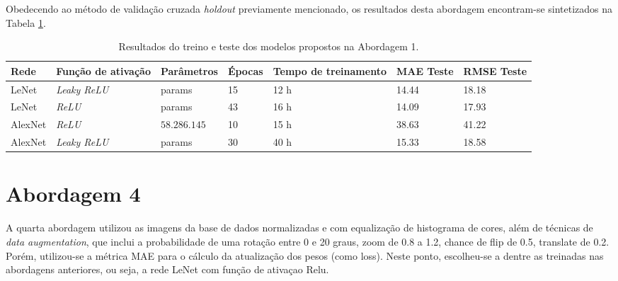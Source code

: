 
	Obedecendo ao método de validação cruzada \emph{holdout} previamente mencionado, os resultados desta abordagem encontram-se sintetizados na Tabela \ref{tab:results-2}.

	\begin{table}[!ht]
		\caption{Resultados do treino e teste dos modelos propostos na Abordagem 1.}
		\label{tab:results-2}
		\begin{adjustbox}{width=1\textwidth}
			\begin{tabular}{l l l l l l l}
				\toprule
				Rede & Função de ativação & Parâmetros & Épocas & Tempo de treinamento & MAE Teste & RMSE Teste \\
				\midrule
				LeNet & \emph{Leaky ReLU} & params & 15 & 12 h & 14.44 & 18.18 \\
				LeNet & \emph{ReLU} & params & 43 & 16 h & 14.09 & 17.93 \\
				AlexNet & \emph{ReLU} & $58.286.145$ & 10 & 15 h & 38.63 & 41.22 \\
				AlexNet & \emph{Leaky ReLU} & params & 30 & 40 h & 15.33 & 18.58 \\
				\bottomrule
			\end{tabular}
		\end{adjustbox}
	\end{table}

\section{Abordagem 4}%
	A quarta abordagem utilizou as imagens da base de dados normalizadas e com equalização de histograma de cores, além de técnicas de \emph{data augmentation}, que inclui a probabilidade de uma rotação entre 0 e 20 graus, zoom de 0.8 a 1.2, chance de flip de 0.5, translate de 0.2. Porém, utilizou-se a métrica MAE para o cálculo da atualização dos pesos (como loss). Neste ponto, escolheu-se a  dentre as treinadas nas abordagens anteriores, ou seja, a rede LeNet com função de ativaçao Relu.

